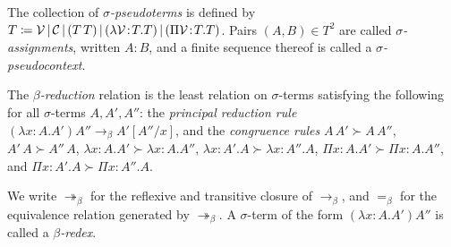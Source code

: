 \documentclass[reqno, twoside]{article}
\begin{document}

    \begin{definition}
        The collection of \textit{$\sigma$-pseudoterms} is defined by $T\coloneqq\mathcal{V}\,|\,\mathcal{C}\,|\,(T\,T)\,|\,(\lambda\mathcal{V}\!:\!T.T)\,|\,(\Pi\mathcal{V}\!:\!T.T)$. Pairs $(A,B)\in T^2$ are called \textit{$\sigma$-assignments}, written $A\!:\!B$, and a finite sequence thereof is called a \textit{$\sigma$-pseudocontext}.
    \end{definition}

    \begin{definition}
        The \textit{$\beta$-reduction} relation is the least relation on $\sigma$-terms satisfying the following for all $\sigma$-terms $A,A',A''$: the \textit{principal reduction rule} $(\lambda x\!:\!A.A')A''\rightarrow_\beta A'[A''/x]$, and the \textit{congruence rules} $A\,A'\succ A\,A''$, $A'\,A\succ A''\,A$, $\lambda x\!:\!A.A'\succ\lambda x\!:\!A.A''$, $\lambda x\!:\!A'.A\succ\lambda x\!:\!A''.A$, $\Pi x\!:\!A.A'\succ\Pi x\!:\!A.A''$, and $\Pi x\!:\!A'.A\succ\Pi x\!:\!A''.A$.
    \end{definition}

    \begin{notation}
        We write $\twoheadrightarrow_\beta$ for the reflexive and transitive closure of $\rightarrow_\beta$, and $=_\beta$ for the equivalence relation generated by $\twoheadrightarrow_\beta$. A $\sigma$-term of the form $(\lambda x\!:\!A.A')A''$ is called a \textit{$\beta$-redex}.
    \end{notation}
\end{document}
